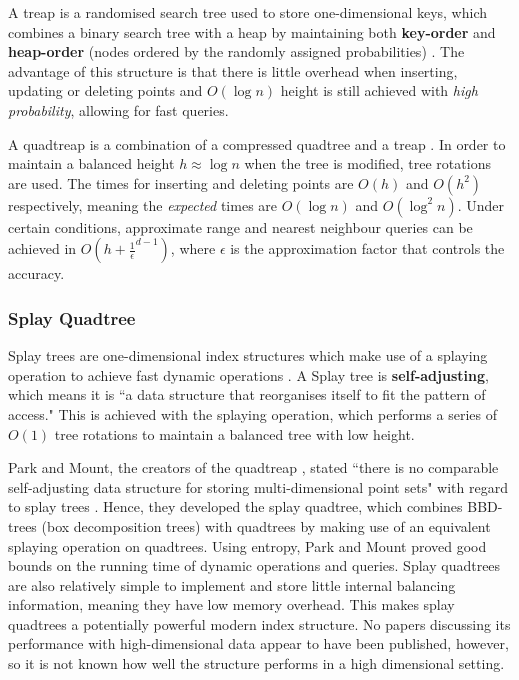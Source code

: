 A treap is a randomised search tree used to store one-dimensional keys, which combines a binary search tree with a heap by maintaining both \textbf{key-order} and \textbf{heap-order} (nodes ordered by the randomly assigned probabilities) \cite{quadtreap}. The advantage of this structure is that there is little overhead when inserting, updating or deleting points and $O(\log n)$ height is still achieved with \textit{high probability}, allowing for fast queries.

A quadtreap is a combination of a compressed quadtree and a treap \cite{quadtreap}. In order to maintain a balanced height $h \approx \log n$ when the tree is modified, tree rotations are used. The times for inserting and deleting points are $O(h)$ and $O(h^2)$ respectively, meaning the \textit{expected} times are $O(\log n)$ and $O(\log^2 n)$. Under certain conditions, approximate range and nearest neighbour queries can be achieved in $O(h + \frac{1}{\epsilon}^{d - 1})$, where $\epsilon$ is the approximation factor that controls the accuracy.

\subsubsection{Splay Quadtree}
\label{sec:splay-quadtree}

Splay trees are one-dimensional index structures which make use of a splaying operation to achieve fast dynamic operations \cite{introduction-to-algorithms}. A Splay tree is \textbf{self-adjusting}, which means it is ``a data structure that reorganises itself to fit the pattern of access." \cite{splay-quadtree} This is achieved with the splaying operation, which performs a series of $O(1)$ tree rotations to maintain a balanced tree with low height.

Park and Mount, the creators of the quadtreap \cite{quadtreap}, stated ``there is no comparable self-adjusting data structure for storing multi-dimensional point sets" with regard to splay trees \cite{splay-quadtree}. Hence, they developed the splay quadtree, which combines BBD-trees (box decomposition trees) with quadtrees by making use of an equivalent splaying operation on quadtrees. Using entropy, Park and Mount proved good bounds on the running time of dynamic operations and queries. Splay quadtrees are also relatively simple to implement and store little internal balancing information, meaning they have low memory overhead. This makes splay quadtrees a potentially powerful modern index structure. No papers discussing its performance with high-dimensional data appear to have been published, however, so it is not known how well the structure performs in a high dimensional setting.
